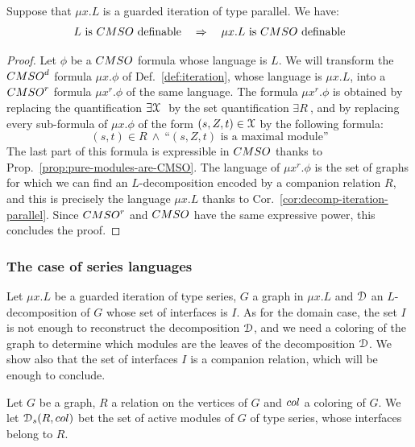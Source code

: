 \begin{theorem} 
Suppose that $\mu x. L$ is a guarded iteration of type parallel. We have: 
$$ L\text{ is $\CMSO$ definable} \quad \Rightarrow \quad  \mu x.L \text{ is  $\CMSO$ definable}$$
\end{theorem}

\begin{proof} Let $\phi$ be a $\CMSO$ formula whose language is $L$.
We will transform the $\CMSOd$ formula $\mu x. \phi$ of Def.~\ref{def:iteration}, whose language is $\mu x. L$, into a $\CMSO^r$ formula  ${\mu x^r. \phi}$ of the same language. The formula ${\mu x^r. \phi}$ is obtained by replacing the quantification $\exists \mathcal X\ $ by the set quantification $\exists R\ $, and by replacing every sub-formula of $\mu x. \phi$ of the form $(s,Z,t)\in \mathcal X$ by the following formula: 
$$ (s,t) \in R \ \wedge\ \text{``$(s,Z,t)$ is a maximal module''} $$
The last part of this formula is expressible in $\CMSO$ thanks to Prop.~\ref{prop:pure-modules-are-CMSO}.  The language of ${\mu x^r. \phi}$ is the set of graphs for which we can find an $L$-decomposition encoded by a companion relation $R$, and this is precisely the language $\mu x. L$ thanks to Cor.~\ref{cor:decomp-iteration-parallel}. Since $\CMSO^r$ and $\CMSO$ have the same expressive power, this concludes the proof.
\end{proof}


\subsubsection{The case of series languages}
Let $\mu x. L$ be a guarded iteration of type series, $G$ a graph in $\mu x. L$ and $\mathcal D$ an $L$-decomposition of $G$ whose set of interfaces is $I$. As for the domain case, the set $I$ is not enough to reconstruct the decomposition $\mathcal D$, and we need a coloring of the graph to determine which modules are the leaves of the decomposition $\mathcal D$. We show also that the set of interfaces $I$ is a companion relation, which will be enough to conclude. 

\begin{definition} Let $G$ be a graph, $R$ a relation on the vertices of $G$ and $\col$ a coloring of $G$.  We let $\cD_\mathsf{s}(R, \col)$ bet the set of active modules of $G$ of type series, whose interfaces belong to $R$. 
\end{definition}


